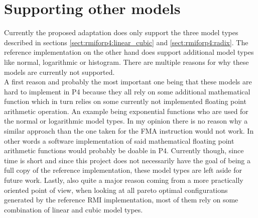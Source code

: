 \section{Supporting other models}
Currently the proposed adaptation does only support the three model types described in sections \ref{sect:rmiforp4:linear_cubic} and \ref{sect:rmiforp4:radix}. The reference implementation on the other hand does support additional model types like normal, logarithmic or histogram. There are multiple reasons for why these models are currently not supported.\\

A first reason and probably the most important one being that these models are hard to implement in P4 because they all rely on some additional mathematical function which in turn relies on some currently not implemented floating point arithmetic operation. An example being exponential functions who are used for the normal or logarithmic model types. In my opinion there is no reason why a similar approach than the one taken for the FMA instruction would not work. In other words a software implementation of said mathematical floating point arithmetic functions would probably be doable in P4. Currently though, since time is short and since this project does not necessarily have the goal of being a full copy of the reference implementation, these model types are left aside for future work. Lastly, also quite a major reason coming from a more practically oriented point of view, when looking at all pareto optimal configurations generated by the reference RMI implementation, most of them rely on some combination of linear and cubic model types.
